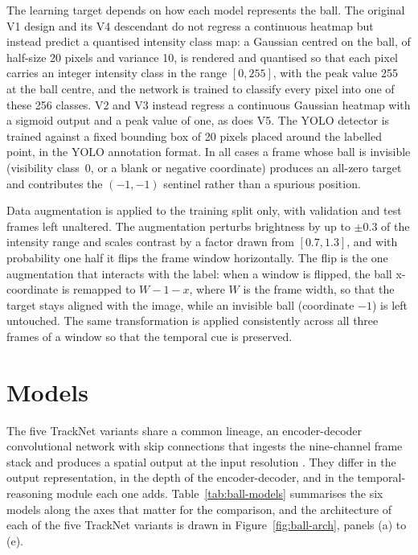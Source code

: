The learning target depends on how each model represents the ball. The original
V1 design and its V4 descendant do not regress a continuous heatmap but instead
predict a quantised intensity class map: a Gaussian centred on the ball, of
half-size 20 pixels and variance 10, is rendered and quantised so that each
pixel carries an integer intensity class in the range $[0, 255]$, with the peak
value 255 at the ball centre, and the network is trained to classify every
pixel into one of these 256 classes. V2 and V3 instead regress a continuous
Gaussian heatmap with a sigmoid output and a peak value of one, as does V5. The
YOLO detector is trained against a fixed bounding box of 20 pixels placed around
the labelled point, in the YOLO annotation format. In all cases a frame whose
ball is invisible (visibility class~0, or a blank or negative coordinate)
produces an all-zero target and contributes the $(-1, -1)$ sentinel rather than
a spurious position.

Data augmentation is applied to the training split only, with validation and
test frames left unaltered. The augmentation perturbs brightness by up to
$\pm 0.3$ of the intensity range and scales contrast by a factor drawn from
$[0.7, 1.3]$, and with probability one half it flips the frame window
horizontally. The flip is the one augmentation that interacts with the label:
when a window is flipped, the ball x-coordinate is remapped to $W - 1 - x$,
where $W$ is the frame width, so that the target stays aligned with the
image, while an invisible ball (coordinate $-1$) is left untouched. The same
transformation is applied consistently across all three frames of a window so
that the temporal cue is preserved.

\section{Models}
\label{sec:ball-models}

The five TrackNet variants share a common lineage, an encoder-decoder
convolutional network with skip connections that ingests the nine-channel frame
stack and produces a spatial output at the input resolution
\cite{huang2019tracknet}. They differ in the output representation, in the depth
of the encoder-decoder, and in the temporal-reasoning module each one adds.
Table~\ref{tab:ball-models} summarises the six models along the axes that
matter for the comparison, and the architecture of each of the five TrackNet
variants is drawn in Figure~\ref{fig:ball-arch}, panels (a) to (e).

